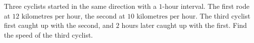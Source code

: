 Three cyclists started in the same direction with a $1$-hour interval. The first rode at $12\text{ kilometres per hour}$, the second at $10\text{ kilometres per hour}$. The third cyclist first caught up with the second, and $2$ hours later caught up with the first. Find the speed of the third cyclist.
